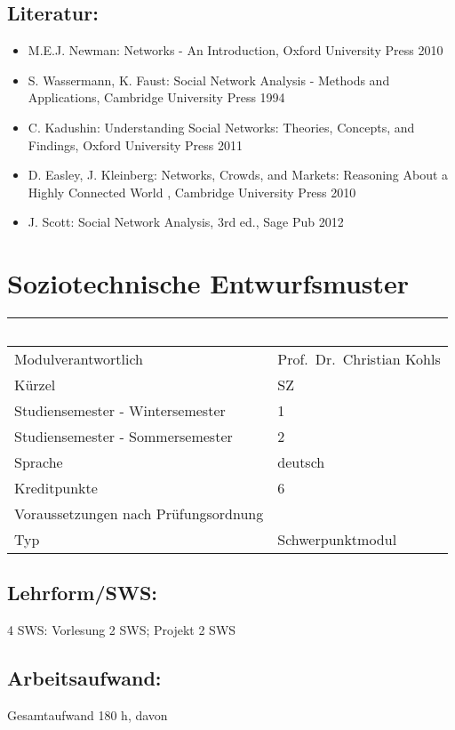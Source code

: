 \section*{Literatur:}\label{literatur-8}

\begin{itemize}
\item
  M.E.J. Newman: Networks - An Introduction, Oxford University Press
  2010
\item
  S. Wassermann, K. Faust: Social Network Analysis - Methods and
  Applications, Cambridge University Press 1994
\item
  C. Kadushin: Understanding Social Networks: Theories, Concepts, and
  Findings, Oxford University Press 2011
\item
  D. Easley, J. Kleinberg: Networks, Crowds, and Markets: Reasoning
  About a Highly Connected World , Cambridge University Press 2010
\item
  J. Scott: Social Network Analysis, 3rd ed., Sage Pub 2012
\end{itemize}

\chapter{Soziotechnische
Entwurfsmuster}\label{soziotechnische-entwurfsmuster}

\begin{longtable}[]{@{}ll@{}}
\toprule
~ & ~\tabularnewline
\midrule
\endhead
Modulverantwortlich & Prof.~Dr.~Christian Kohls\tabularnewline
Kürzel & SZ\tabularnewline
Studiensemester - Wintersemester & 1\tabularnewline
Studiensemester - Sommersemester & 2\tabularnewline
Sprache & deutsch\tabularnewline
Kreditpunkte & 6\tabularnewline
Voraussetzungen nach Prüfungsordnung &\tabularnewline
Typ & Schwerpunktmodul\tabularnewline
\bottomrule
\end{longtable}

\section*{Lehrform/SWS:}\label{lehrformsws-12}

4 SWS: Vorlesung 2 SWS; Projekt 2 SWS

\section*{Arbeitsaufwand:}\label{arbeitsaufwand-18}

Gesamtaufwand 180 h, davon

